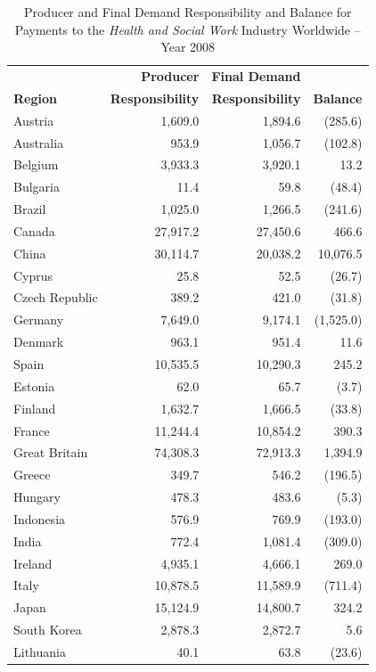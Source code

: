 \documentclass[a4paper,12pt, ]{article}
\begin{document}
\begin{table} %
\caption{Producer and Final Demand Responsibility and Balance for Payments to the \textit{Health and Social Work} Industry Worldwide -- Year 2008} 
\begin{center}
\small \begin{tabular}{lrrr}
 & \textbf{Producer} & \textbf{Final Demand} & \\ 
\textbf{Region} & \textbf{Responsibility }& \textbf{Responsibility} & \textbf{Balance}\\ 
\hline
Austria &  1,609.0  &  1,894.6  & (285.6)\\ 
Australia &  953.9  &  1,056.7  & (102.8)\\ 
Belgium &  3,933.3  &  3,920.1  & 13.2 \\ 
Bulgaria &  11.4  &  59.8  & (48.4)\\ 
Brazil &  1,025.0  &  1,266.5  & (241.6)\\ 
Canada &  27,917.2  &  27,450.6  & 466.6 \\ 
China &  30,114.7  &  20,038.2  & 10,076.5 \\ 
Cyprus &  25.8  &  52.5  & (26.7)\\ 
Czech Republic &  389.2  &  421.0  & (31.8)\\ 
Germany &  7,649.0  &  9,174.1  & (1,525.0)\\ 
Denmark &  963.1  &  951.4  & 11.6 \\ 
Spain &  10,535.5  &  10,290.3  & 245.2 \\ 
Estonia &  62.0  &  65.7  & (3.7)\\ 
Finland &  1,632.7  &  1,666.5  & (33.8)\\ 
France &  11,244.4  &  10,854.2  & 390.3 \\ 
Great Britain &  74,308.3  &  72,913.3  & 1,394.9 \\ 
Greece &  349.7  &  546.2  & (196.5)\\ 
Hungary &  478.3  &  483.6  & (5.3)\\ 
Indonesia &  576.9  &  769.9  & (193.0)\\ 
India &  772.4  &  1,081.4  & (309.0)\\ 
Ireland &  4,935.1  &  4,666.1  & 269.0 \\ 
Italy &  10,878.5  &  11,589.9  & (711.4)\\ 
Japan &  15,124.9  &  14,800.7  & 324.2 \\ 
South Korea &  2,878.3  &  2,872.7  & 5.6 \\ 
Lithuania &  40.1  &  63.8  & (23.6)\\ 

\end{tabular}
\end{center}
\end{table}
\end{document}

